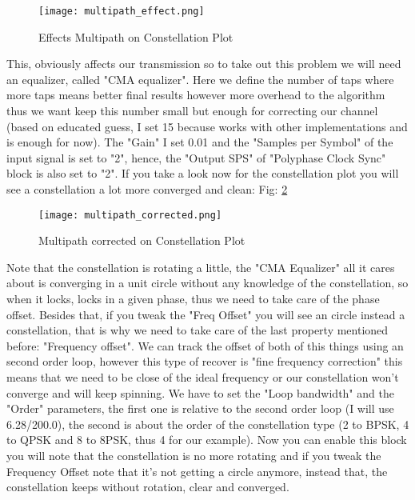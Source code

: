 \documentclass[a4paper, 10pt, conference]{ieeeconf}      %
\begin{document}
    \begin{figure}
        \centering
        \texttt{[image: multipath\_effect.png]}
        \caption{Effects Multipath on Constellation Plot}
        \label{fig:multipath_effect}
    \end{figure}
    
    This, obviously affects our transmission so to take out this problem we will need an equalizer, called "CMA equalizer". Here we define the number of taps where more taps means better final results however more overhead to the algorithm thus we want keep this number small but enough for correcting our channel (based on educated guess, I set 15 because works with other implementations and is enough for now). The "Gain" I set 0.01 and the "Samples per Symbol" of the input signal is set to "2", hence, the "Output SPS" of "Polyphase Clock Sync" block is also set to "2". If you take a look now for the constellation plot you will see a constellation a lot more converged and clean: Fig: \ref{fig:multipath_corrected}

    \begin{figure}
        \centering
        \texttt{[image: multipath\_corrected.png]}
        \caption{Multipath corrected on Constellation Plot}
        \label{fig:multipath_corrected}
    \end{figure}
    
    Note that the constellation is rotating a little, the "CMA Equalizer" all it cares about is converging in a unit circle without any knowledge of the constellation, so when it locks, locks in a given phase, thus we need to take care of the phase offset. Besides that, if you tweak the "Freq Offset" you will see an circle instead a constellation, that is why we need to take care of the last property mentioned before: "Frequency offset".
    We can track the offset of both of this things using an second order loop, however this type of recover is "fine frequency correction" this means that we need to be close of the ideal frequency or our constellation won't converge and will keep spinning. 
    We have to set the "Loop bandwidth" and the "Order" parameters, the first one is relative to the second order loop (I will use 6.28/200.0), the second is about the order of the constellation type (2 to BPSK, 4 to QPSK and 8 to 8PSK, thus 4 for our example). Now you can enable this block you will note that the constellation is no more rotating and if you tweak the Frequency Offset note that it's not getting a circle anymore, instead that, the constellation keeps without rotation, clear and converged.  
\end{document}
